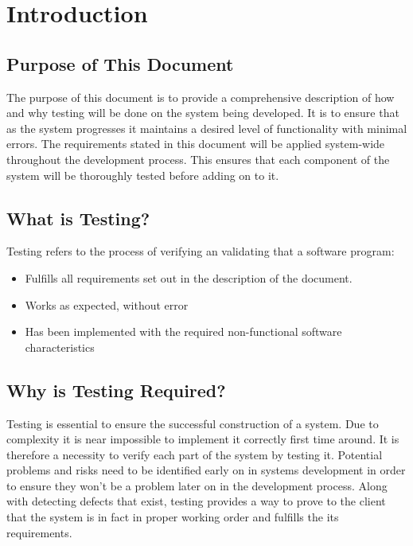 \documentclass[a4paper]{article}
\begin{document}


\tableofcontents
\newpage

\section{Introduction}
  \subsection{Purpose of This Document}
  The purpose of this document is to provide a comprehensive description of how and why testing will be done on the system being developed. It is to ensure that as the system progresses it maintains a desired level of functionality with minimal errors.
  \newline
  \newline
  The requirements stated in this document will be applied system-wide throughout the development process. This ensures that each component of the system will be thoroughly tested before adding on to it.
  	
  \subsection{What is Testing?}
  Testing refers to the process of verifying an validating that a software program:
  \begin{itemize}
  \item Fulfills all requirements set out in the description of the document.
  \item Works as expected, without error
  \item Has been implemented with the required non-functional software characteristics
  \end{itemize}
  	
  \subsection{Why is Testing Required?}
  Testing is essential to ensure the successful construction of a system. Due to complexity it is near impossible to implement it correctly first time around. It is therefore a necessity to verify each part of the system by testing it.
  \newline
  \newline
  Potential problems and risks need to be identified early on in systems development in order to ensure they won't be a problem later on in the development process.
  \newline
  \newline
  Along with detecting defects that exist, testing provides a way to prove to the client that the system is in fact in proper working order and fulfills the its requirements.
\end{document}
